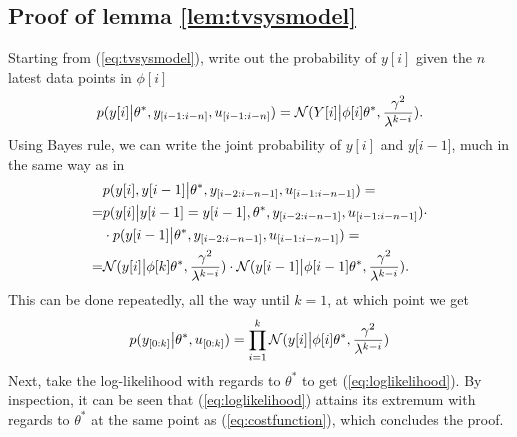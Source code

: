 \subsection{Proof of lemma \ref{lem:tvsysmodel}}
\label{app:likelihoodproof}
Starting from (\ref{eq:tvsysmodel}), write out the probability of
$y[i]$ given the $n$ latest data points in $\phi[i]$
\begin{equation*}
    p(y[i]\big{\vert} \theta^*,  y_{[i-1:i-n]}, u_{[i-1:i-n]}) =
    \mathcal{N}(Y[i]\big{\vert}\phi[i]\theta^*, \frac{\gamma^2}{\lambda^{k-i}}).
\end{equation*}
Using Bayes rule, we can write the joint probability of $y[i]$ and $y[i-1$], much
in the same way as in \cite[Lemma 5.1]{ljung_system_1999}
\begin{equation*}
    \small
    \begin{aligned}
        &p(y[i],y[i-1]\big{\vert}\theta^*,y_{[i-2:i-n-1]}, u_{[i-1:i-n-1]}) = \\
        =& p(y[i]\big{\vert}y[i-1]=y[i-1], \theta^*, y_{[i-2:i-n-1]}, u_{[i-1:i-n-1]})\cdot \\
        &\cdot p(y[i-1]\big{\vert}\theta^*, y_{[i-2:i-n-1]}, u_{[i-1:i-n-1]}) = \\
        =& \mathcal{N}(y[i]\big{\vert}\phi[k]\theta^*, \frac{\gamma^2}{\lambda^{k-i}})\cdot
        \mathcal{N}(y[i-1]\big{\vert}\phi[i-1]\theta^*, \frac{\gamma^2}{\lambda^{k-i}}).
\end{aligned}
\notag
\end{equation*}
This can be done repeatedly, all the way until $k=1$, at which point we get
\begin{equation*}
    p(y_{[0:k]}\big{\vert}\theta^*, u_{[0:k]}) 
    = \prod\limits_{i=1}^k \mathcal{N}(y[i]\big{|}\phi[i]\theta^*, \frac{\gamma^2}{\lambda^{k-i}})
\end{equation*}
Next, take the log-likelihood with regards to $\theta^*$ to get (\ref{eq:loglikelihood}).
By inspection, it can be seen that (\ref{eq:loglikelihood}) attains its extremum 
with regards to $\theta^*$ at the same point as (\ref{eq:costfunction}), which 
concludes the proof.